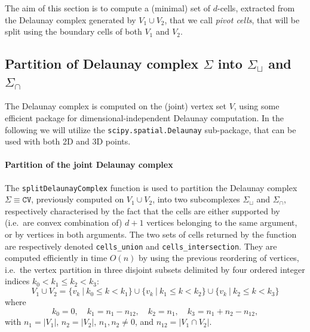 \documentclass[11pt,oneside]{article}	%
\begin{document}
The aim of this section is to compute a (minimal) set of $d$-cells, extracted from the Delaunay complex generated by $V_1 \cup V_2$, that we call \emph{pivot cells}, that will be split using the boundary cells of both $V_1$ and $V_2$.

\subsection{Partition of Delaunay complex $\Sigma$ into $\Sigma_\sqcup$ and $\Sigma_\cap$}

The Delaunay complex is computed on the (joint) vertex set $V$, using some efficient package for dimensional-independent Delaunay computation. In the following  we will utilize the \texttt{scipy.spatial.Delaunay} sub-package, that can be used with both 2D and 3D points. 

\paragraph{Partition of the joint Delaunay complex} 

The \texttt{splitDelaunayComplex} function is used to partition the Delaunay complex $\Sigma\equiv\texttt{CV}$, previously computed on $V_1 \cup V_2$, into two subcomplexes $\Sigma_\sqcup$ and $\Sigma_\cap$, respectively characterised by the fact that the cells  are either supported by (i.e.~are convex combination of)  $d+1$ vertices belonging to the same argument, or by vertices in both arguments.
The two sets of cells returned by the function are respectively denoted \texttt{cells\_union} and \texttt{cells\_intersection}. They are computed efficiently in time $O(n)$ by using the previous reordering of vertices, i.e.~the vertex partition in three disjoint subsets delimited by four ordered integer indices $k_0 < k_1 \leq k_2 < k_3$:
\[
V_1 \cup V_2 = 
\{v_k\ |\ k_0\leq k< k_1\} \cup
\{v_k\ |\ k_1\leq k< k_2\} \cup
\{v_k\ |\ k_2\leq k< k_3\}
\]
where
\[
k_0 =0, \quad k_1 =n_1-n_{12}, \quad k_2 =n_1, \quad  k_3=n_1+n_2-n_{12},
\]
with $n_1=|V_1|$, $n_2=|V_2|$, $n_1, n_2\not=0$, and $n_{12}=|V_1\cap V_2|$.
\end{document}
